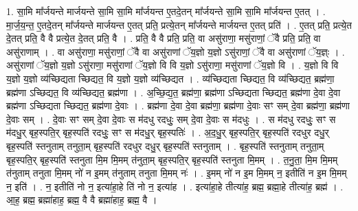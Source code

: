 \documentclass[17pt]{extarticle}
\begin{document}
1. सा॒मि मा᳚र्जयन्ते मार्जयन्ते सा॒मि सा॒मि मा᳚र्जयन्त ए॒तदे॒तन् मा᳚र्जयन्ते सा॒मि सा॒मि मा᳚र्जयन्त ए॒तत् । . मा॒र्ज॒य॒न्त॒ ए॒तदे॒तन् मा᳚र्जयन्ते मार्जयन्त ए॒तत् प्रति॒ प्रत्ये॒तन् मा᳚र्जयन्ते मार्जयन्त ए॒तत् प्रति॑ । . ए॒तत् प्रति॒ प्रत्ये॒त दे॒तत् प्रति॒ वै वै प्रत्ये॒त दे॒तत् प्रति॒ वै । . प्रति॒ वै वै प्रति॒ प्रति॒ वा असु॑राणा॒ मसु॑राणां॒ ॅवै प्रति॒ प्रति॒ वा असु॑राणाम् । . वा असु॑राणा॒ मसु॑राणां॒ ॅवै वा असु॑राणां ॅय॒ज्ञो य॒ज्ञो ऽसु॑राणां॒ ॅवै वा असु॑राणां ॅय॒ज्ञ्ः । . असु॑राणां ॅय॒ज्ञो य॒ज्ञो ऽसु॑राणा॒ मसु॑राणां ॅय॒ज्ञो वि वि य॒ज्ञो ऽसु॑राणा॒ मसु॑राणां ॅय॒ज्ञो वि । . य॒ज्ञो वि वि य॒ज्ञो य॒ज्ञो व्य॑च्छिद्यता च्छिद्यत॒ वि य॒ज्ञो य॒ज्ञो व्य॑च्छिद्यत । . व्य॑च्छिद्यता च्छिद्यत॒ वि व्य॑च्छिद्यत॒ ब्रह्म॑णा॒ ब्रह्म॑णा ऽच्छिद्यत॒ वि व्य॑च्छिद्यत॒ ब्रह्म॑णा । . अ॒च्छि॒द्य॒त॒ ब्रह्म॑णा॒ ब्रह्म॑णा ऽच्छिद्यता च्छिद्यत॒ ब्रह्म॑णा दे॒वा दे॒वा ब्रह्म॑णा ऽच्छिद्यता च्छिद्यत॒ ब्रह्म॑णा दे॒वाः । . ब्रह्म॑णा दे॒वा दे॒वा ब्रह्म॑णा॒ ब्रह्म॑णा दे॒वाः सꣳ सम् दे॒वा ब्रह्म॑णा॒ ब्रह्म॑णा दे॒वाः सम् । . दे॒वाः सꣳ सम् दे॒वा दे॒वाः स म॑दधु रदधुः॒ सम् दे॒वा दे॒वाः स म॑दधुः । . स म॑दधु रदधुः॒ सꣳ स म॑दधु॒र् बृह॒स्पति॒र् बृह॒स्पति॑ रदधुः॒ सꣳ स म॑दधु॒र् बृह॒स्पतिः॑ । . अ॒द॒धु॒र् बृह॒स्पति॒र् बृह॒स्पति॑ रदधुर दधु॒र् बृह॒स्पति॑ स्तनुताम् तनुता॒म् बृह॒स्पति॑ रदधुर दधु॒र् बृह॒स्पति॑ स्तनुताम् । . बृह॒स्पति॑ स्तनुताम् तनुता॒म् बृह॒स्पति॒र् बृह॒स्पति॑ स्तनुता मि॒म मि॒मम् त॑नुता॒म् बृह॒स्पति॒र् बृह॒स्पति॑ स्तनुता मि॒मम् । . त॒नु॒ता॒ मि॒म मि॒मम् त॑नुताम् तनुता मि॒मम् नो॑ न इ॒मम् त॑नुताम् तनुता मि॒मम् नः॑ । . इ॒मम् नो॑ न इ॒म मि॒मम् न॒ इतीति॑ न इ॒म मि॒मम् न॒ इति॑ । . न॒ इतीति॑ नो न॒ इत्या॑हा॒हे ति॑ नो न॒ इत्या॑ह । . इत्या॑हा॒हे तीत्या॑ह॒ ब्रह्म॒ ब्रह्मा॒हे तीत्या॑ह॒ ब्रह्म॑ । . आ॒ह॒ ब्रह्म॒ ब्रह्मा॑हाह॒ ब्रह्म॒ वै वै ब्रह्मा॑हाह॒ ब्रह्म॒ वै । \newline
\end{document}
